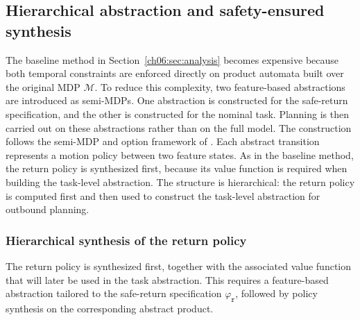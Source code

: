 \subsection{Hierarchical abstraction and safety-ensured synthesis}
\label{ch06:sec:solution}

The baseline method in Section~\ref{ch06:sec:analysis} becomes expensive because
both temporal constraints are enforced directly on product automata built over
the original MDP \(\mathcal{M}\). To reduce this complexity, two feature-based
abstractions are introduced as semi-MDPs. One abstraction is constructed for
the safe-return specification, and the other is constructed for the nominal
task. Planning is then carried out on these abstractions rather than on the
full model.
The construction follows the semi-MDP and option framework of
\citet{sutton1999between}. Each abstract transition represents a motion policy
between two feature states. As in the baseline method, the return policy is
synthesized first, because its value function is required when building the
task-level abstraction. The structure is hierarchical: the return policy is
computed first and then used to construct the task-level abstraction for
outbound planning.


\subsubsection{Hierarchical synthesis of the return policy}
\label{ch06:subsec:safe-return-plan}

The return policy is synthesized first, together with the associated value
function that will later be used in the task abstraction. This requires a
feature-based abstraction tailored to the safe-return specification
\(\varphi_{\texttt{r}}\), followed by policy synthesis on the corresponding
abstract product.

